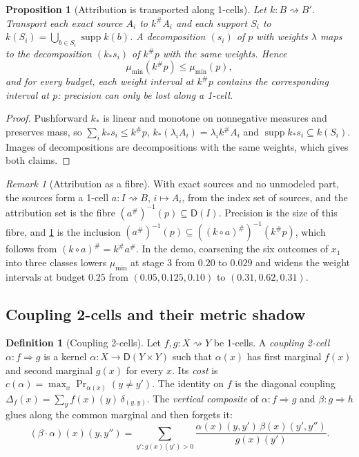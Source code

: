 \documentclass[11pt]{article}
\newtheorem{proposition}[theorem]{Proposition}
\theoremstyle{definition}
\newtheorem{definition}[theorem]{Definition}
\theoremstyle{remark}
\newtheorem{remark}[theorem]{Remark}
\newcommand{\D}{\mathsf{D}}
\newcommand{\supp}{\operatorname{supp}}
\begin{document}
\begin{proposition}[Attribution is transported along 1-cells]\label{prop:transport}
Let $k\colon B\rightsquigarrow B'$. Transport each exact source $A_i$ to $k^\#A_i$ and each support
$S_i$ to $k(S_i)=\bigcup_{b\in S_i}\supp k(b)$. A decomposition $(s_i)$ of $p$ with weights $\lambda$
maps to the decomposition $(k_*s_i)$ of $k^\#p$ with the same weights. Hence
\[
\mu_{\min}(k^\#p)\le\mu_{\min}(p),
\]
and for every budget, each weight interval at $k^\#p$ contains the corresponding interval at $p$:
precision can only be lost along a 1-cell.
\end{proposition}
\begin{proof}
Pushforward $k_*$ is linear and monotone on nonnegative measures and preserves mass, so
$\sum_ik_*s_i\le k^\#p$, $k_*(\lambda_iA_i)=\lambda_ik^\#A_i$ and $\supp k_*s_i\subseteq k(S_i)$.
Images of decompositions are decompositions with the same weights, which gives both claims.
\end{proof}

\begin{remark}[Attribution as a fibre]
With exact sources and no unmodeled part, the sources form a 1-cell $a\colon I\rightsquigarrow B$,
$i\mapsto A_i$, from the index set of sources, and the attribution set is the fibre
$(a^\#)^{-1}(p)\subseteq\D(I)$. Precision is the size of this fibre, and \cref{prop:transport} is the
inclusion $(a^\#)^{-1}(p)\subseteq((k\circ a)^\#)^{-1}(k^\#p)$, which follows from
$(k\circ a)^\#=k^\#a^\#$. In the demo, coarsening the six outcomes of $x_1$ into three classes lowers
$\mu_{\min}$ at stage 3 from $0.20$ to $0.029$ and widens the weight intervals at budget $0.25$ from
$(0.05,0.125,0.10)$ to $(0.31,0.62,0.31)$.
\end{remark}

\subsection{Coupling 2-cells and their metric shadow}\label{sec:twocells}

\begin{definition}[Coupling 2-cells]\label{def:twocell}
Let $f,g\colon X\rightsquigarrow Y$ be 1-cells. A \emph{coupling 2-cell} $\alpha\colon f\Rightarrow g$
is a kernel $\alpha\colon X\to\D(Y\times Y)$ such that $\alpha(x)$ has first marginal $f(x)$ and second
marginal $g(x)$ for every $x$. Its \emph{cost} is
$c(\alpha)=\max_x\Pr_{\alpha(x)}(y\ne y')$. The identity on $f$ is the diagonal coupling
$\Delta_f(x)=\sum_yf(x)(y)\,\delta_{(y,y)}$. The \emph{vertical composite} of $\alpha\colon f\Rightarrow g$
and $\beta\colon g\Rightarrow h$ glues along the common marginal and then forgets it:
\[
(\beta\cdot\alpha)(x)(y,y'')=\sum_{y'\colon g(x)(y')>0}\frac{\alpha(x)(y,y')\,\beta(x)(y',y'')}{g(x)(y')}.
\]
\end{definition}
\end{document}
